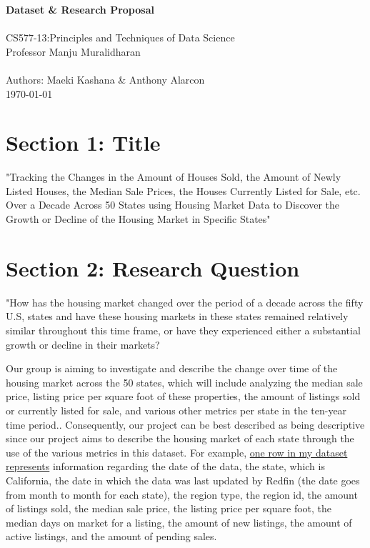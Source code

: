 \documentclass[12pt]{article}
\begin{document}
{\centering \LARGE

\vspace*{2.5in}


{\bfseries Dataset \& Research Proposal}\\ \ \\
CS577-13:Principles and Techniques of Data Science\\
Professor Manju Muralidharan\\ \ \\
Authors: Maeki Kashana \& Anthony Alarcon\\
\today

}

\newpage
\tableofcontents
\newpage


\section{Section 1: Title}

"Tracking the Changes in the Amount of Houses Sold, the Amount of Newly Listed Houses, the Median Sale Prices, the Houses Currently Listed for Sale, etc. Over a Decade Across 50 States using Housing Market Data to Discover the Growth or Decline of the Housing Market in Specific States"

\section{Section 2: Research Question}
"How has the housing market changed over the period of a decade across the fifty U.S, states and have these housing markets in these states remained relatively similar throughout this time frame, or have they experienced either a substantial growth or decline in their markets?

Our group is aiming to investigate and describe the change over time of the housing market across the 50 states, which will include analyzing the median sale price, listing price per square foot of these properties, the amount of listings sold or currently listed for sale, and various other metrics per state in the ten-year time period.. Consequently, our project can be best described as being descriptive since our project aims to describe the housing market of each state through the use of the various metrics in this dataset. For example, \underline{one row in my dataset represents} information regarding the date of the data, the state, which is California, the date in which the data was last updated by Redfin (the date goes from month to month for each state), the region type, the region id, the amount of listings sold, the median sale price, the listing price per square foot, the median days on market for a listing, the amount of new listings, the amount of active listings, and the amount of pending sales.
\end{document}
